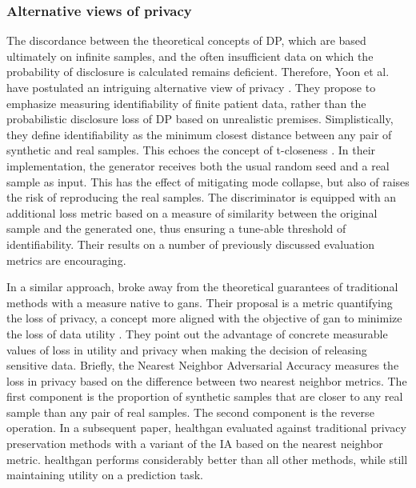            \subsubsection{Alternative views of privacy}
            The discordance between the theoretical concepts of DP, which are  based ultimately on infinite samples, and the often insufficient data on which the probability of disclosure is calculated remains deficient. Therefore, Yoon et al. have postulated an intriguing alternative view of privacy \cite{Yoon2020-anon}. They propose to emphasize measuring identifiability of finite patient data, rather than the probabilistic disclosure loss of DP based on unrealistic premises. Simplistically, they define identifiability as the minimum closest distance between any pair of synthetic and real samples. This echoes the concept of t-closeness \cite{Li2010-qq}. In their implementation, the generator receives both the usual random seed and a real sample as input. This has the effect of mitigating mode collapse, but also of raises the risk of reproducing the real samples. The discriminator is equipped with an additional loss metric based on a measure of similarity between the original sample and the generated one, thus ensuring a tune-able threshold of identifiability. Their results on a number of previously discussed evaluation metrics are encouraging.\par
            
            In a similar approach, \citeauthor{Yale_2020} broke away from the theoretical guarantees of traditional methods with a measure native to \glspl{gan}. Their proposal is a metric quantifying the loss of privacy, a concept more aligned with the objective of \gls{gan} to minimize the loss of data utility \cite{yale:hal-02160496,p2019}. They point out the advantage of concrete measurable values of loss in utility and privacy when making the decision of releasing sensitive data. Briefly, the Nearest Neighbor Adversarial Accuracy measures the loss in privacy based on the difference between two nearest neighbor metrics. The  first component is the proportion of synthetic samples that are closer to any real sample than any pair of real samples. The second component is the reverse operation. In a subsequent paper, \gls{healthgan} evaluated against traditional privacy preservation methods with a variant of the IA based on the nearest neighbor metric. \gls{healthgan} performs considerably better than all other methods, while still maintaining utility on a prediction task.


       



